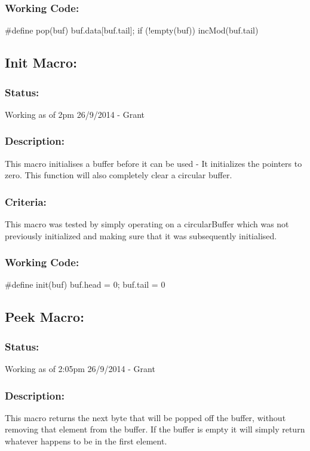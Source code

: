 \documentclass[]{article}
\begin{document}
\subsubsection{Working Code:}
\#define pop(buf) buf.data[buf.tail]; if (!empty(buf)) incMod(buf.tail)

\subsection{Init Macro:}
\subsubsection{Status:}
Working as of 2pm 26/9/2014 - Grant

\subsubsection{Description:}
This macro initialises a buffer before it can be used - It initializes the pointers to zero. This function will also completely clear a circular buffer.

\subsubsection{Criteria:}
This macro was tested by simply operating on a circularBuffer which was not previously initialized and making sure that it was subsequently initialised.

\subsubsection{Working Code:}
\#define init(buf) buf.head = 0; buf.tail = 0

\subsection{Peek Macro:}
\subsubsection{Status:}
Working as of 2:05pm 26/9/2014 - Grant

\subsubsection{Description:}
This macro returns the next byte that will be popped off the buffer, without removing that element from the buffer. If the buffer is empty it will simply return whatever happens to be in the first element.
\end{document}
